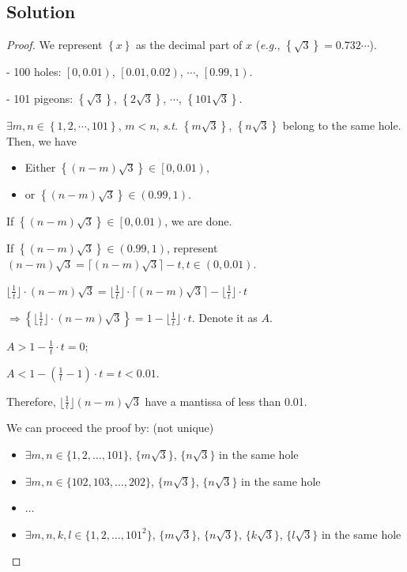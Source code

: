 \documentclass[12pt]{article}
\begin{document}
\subsection{Solution}
	\begin{proof}
		\par We represent $\left\lbrace x \right\rbrace$ as the decimal part of $x$ (\textit{e.g.}, $\left\lbrace \sqrt{3} \right\rbrace = 0.732\cdots$).
		\par  - 100 holes: $\left[ 0,0.01\right)$, $\left[ 0.01,0.02\right)$, $\cdots$, $\left[ 0.99,1\right)$.
		\par - 101 pigeons: $\left\lbrace \sqrt{3} \right\rbrace$, $\left\lbrace 2\sqrt{3} \right\rbrace$, $\cdots$, $\left\lbrace 101\sqrt{3} \right\rbrace$.
		\par $\exists m,n \in \left\lbrace 1,2,\cdots,101 \right\rbrace$, $m < n$, \textit{s.t.} $\left\lbrace m\sqrt{3} \right\rbrace$, $\left\lbrace n\sqrt{3} \right\rbrace$ belong to the same hole. Then, we have 
		\begin{itemize}
			\item Either $\left\lbrace (n-m)\sqrt{3} \right\rbrace \in \left[ 0, 0.01\right) $,
			\item or $\left\lbrace (n-m)\sqrt{3} \right\rbrace \in \left( 0.99, 1\right) $.
		\end{itemize}
		\par If $\left\lbrace (n-m)\sqrt{3} \right\rbrace \in \left[ 0, 0.01\right) $, we are done.
		\par If $\left\lbrace (n-m)\sqrt{3} \right\rbrace \in \left( 0.99, 1\right) $, represent $(n-m) \sqrt{3} = \lceil  (n-m)\sqrt{3} \rceil  - t, t \in (0,0.01)$.
		\par $\lfloor \frac{1}{t} \rfloor \cdot (n-m) \sqrt{3} = \lfloor \frac{1}{t} \rfloor \cdot \lceil (n-m) \sqrt{3} \rceil - \lfloor \frac{1}{t} \rfloor \cdot t$
		\par $\Rightarrow \left\lbrace \lfloor \frac{1}{t}\rfloor \cdot (n-m)\sqrt{3} \right\rbrace = 1 - \lfloor \frac{1}{t}\rfloor \cdot t$. Denote it as $A$.
		\par $A > 1 - \frac{1}{t} \cdot t = 0$;
		\par $A < 1 - \left( \frac{1}{t} - 1 \right) \cdot t = t < 0.01$.
		\par Therefore, $\lfloor \frac{1}{t} \rfloor (n-m) \sqrt{3}$ have a mantissa of less than 0.01.
		\par We can proceed the proof by: (not unique)
		\begin{itemize}
			\item $\exists m,n \in \{1,2,\dots, 101\}$, $\{m\sqrt{3}\}$, $\{n\sqrt{3}\}$ in the same hole
			\item $\exists m,n \in \{102,103,\dots, 202\}$, $\{m\sqrt{3}\}$, $\{n\sqrt{3}\}$ in the same hole
			\item $\dots$
			\item $\exists m,n,k,l \in \{1,2,\dots, 101^2\}$, $\{m\sqrt{3}\}$, $\{n\sqrt{3}\}$, $\{k\sqrt{3}\}$, $\{l\sqrt{3}\}$ in the same hole
		\end{itemize}
	\end{proof}
\end{document}

